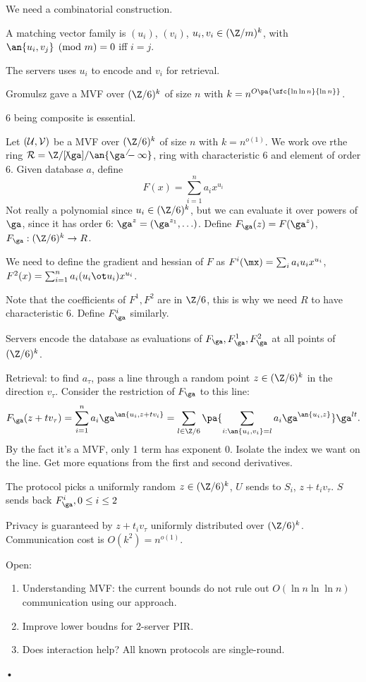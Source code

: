 We need a combinatorial construction.
\begin{df}
A matching vector family is $(u_i)$, $(v_i)$, $u_i,v_i\in (\Z/m)^k$, with $\an{u_i,v_j}\pmod m = 0$ iff $i=j$. 
\end{df}
The servers uses $u_i$ to encode and $v_i$ for retrieval. 

\begin{thm}
Gromulsz gave a MVF over $(\Z/6)^k$ of size $n$ with $k=n^{O\pa{\sfc{\ln \ln n}{\ln n}}}$. 
\end{thm}
6 being composite is essential.

Let $(\cal U, \cal V)$ be a MVF over $(\Z/6)^k$ of size $n$ with $k=n^{o(1)}$. We work ove rthe ring $\cal R=\Z/6[\ga]/\an{\ga^6-1}$, ring with characteristic 6 and element of order 6. Given database $a$, define
\[
F(x)=\sum_{i=1}^n a_ix^{u_i}
\]
Not really a polynomial since $u_i\in (\Z/6)^k$, but we can evaluate it over powers of $\ga$, since it has order 6: $\ga^z=(\ga^{z_1},\ldots)$. Define $F_\ga(z)=F(\ga^z)$, $F_{\ga}:(\Z/6)^k\to R$.

We need to define the gradient and hessian of $F$ as $F^i(\mx)=\sum_i a_i u_ix^{u_i}$, $F^2(x)=\sum_{i=1}^n a_i(u_i\ot u_i) x^{u_i}$. 

Note that the coefficients of $F^1,F^2$ are in $\Z/6$, this is why we need $R$ to have characteristic 6. Define $F_\ga^i$ similarly.

Servers encode the database as evaluations of $F_\ga, F_\ga^1,F_\ga^2$ at all points of $(\Z/6)^k$.

Retrieval: to find $a_\tau$, pass a line through a random point $z\in (\Z/6)^k$ in the direction $v_\tau$. Consider the restriction of $F_\ga$ to this line:
\[
F_\ga(z+tv_\tau) = \sum_{i=1}^n a_i \ga^{\an{u_i,z+tv_i}}=
\sum_{l\in \Z/6} \pa{\sum_{i:\an{u_i,v_i}=l} a_i \ga^{\an{u_i,z}}} \ga^{lt}.
\]
By the fact it's a MVF, only 1 term has exponent 0.
Isolate the index we want on the line.
Get more equations from the first and second derivatives. 

The protocol picks a uniformly random $z\in (\Z/6)^k$, $U$ sends to $S_i$, $z+t_iv_\tau$. $S$ sends back $F_\ga^i,0\le i\le 2$

Privacy is guaranteed by $z+t_iv_\tau$ uniformly distributed over $(\Z/6)^k$. Communication cost is $O(k^2)=n^{o(1)}$. 

Open:
\begin{enumerate}
\item
Understanding MVF: the current bounds do not rule out $O(\ln n\ln \ln n)$ communication using our approach.
\item
Improve lower boudns for 2-server PIR.
\item
Does interaction help? All known protocols are single-round.
\end{enumerate}•